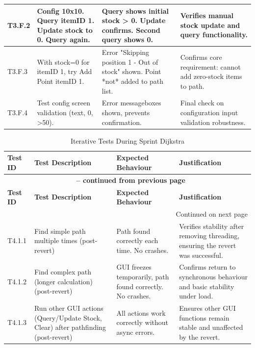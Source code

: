 \begin{longtable}{|p{}|p{}|p{}|p{}|}
	\hline
	T3.F.2 & Config 10x10. Query itemID 1. Update stock to 0. Query again. & Query shows initial stock > 0. Update confirms. Second query shows 0. & Verifies manual stock update and query functionality. \\
	\hline
	T3.F.3 & With stock=0 for itemID 1, try Add Point itemID 1. & Error "Skipping position 1 - Out of stock" shown. Point *not* added to path list. & Confirms core requirement: cannot add zero-stock items to path. \\
	\hline
	T3.F.4 & Test config screen validation (text, 0, >50). & Error messageboxes shown, prevents confirmation. & Final check on configuration input validation robustness. \\
	\hline
\end{longtable}


\begin{longtable}{|p{}|p{}|p{}|p{}|}
	\caption{Iterative Tests During Sprint Dijkstra} \label{tab:sprint_dijkstra_tests_lt_rev} \\
	\hline
	\textbf{Test ID} & \textbf{Test Description} & \textbf{Expected Behaviour} & \textbf{Justification} \\
	\hline
	\endfirsthead
	\multicolumn{4}{c}{{\bfseries \tablename\ \thetable{} -- continued from previous page}} \\ \hline
	\textbf{Test ID} & \textbf{Test Description} & \textbf{Expected Behaviour} & \textbf{Justification} \\ \hline \endhead
	\hline \multicolumn{4}{r}{{Continued on next page}} \\ \endfoot \hline \endlastfoot
	
	T4.1.1 & Find simple path multiple times (post-revert) & Path found correctly each time. No crashes. & Verifies stability after removing threading, ensuring the revert was successful. \\
	\hline
	T4.1.2 & Find complex path (longer calculation) (post-revert) & GUI freezes temporarily, path found correctly. No crashes. & Confirms return to synchronous behaviour and basic stability under load. \\
	\hline
	T4.1.3 & Run other GUI actions (Query/Update Stock, Clear) after pathfinding (post-revert) & All actions work correctly without async errors. & Ensures other GUI functions remain stable and unaffected by the revert. \\
	\hline
\end{longtable}

